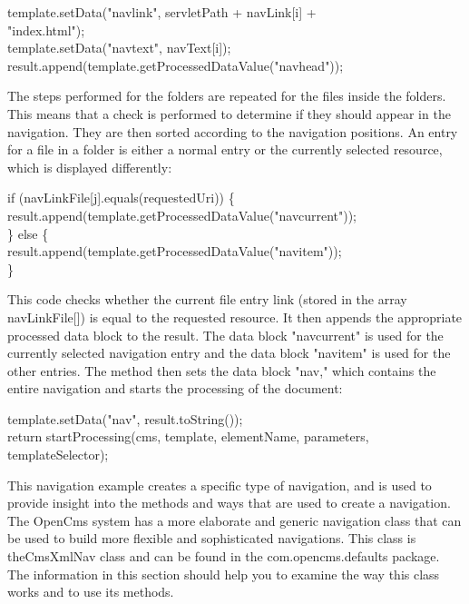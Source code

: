 \begin{java}
template.setData("navlink", servletPath + navLink[i] +\\
\jtabc    "index.html");\\
template.setData("navtext", navText[i]);\\
result.append(template.getProcessedDataValue("navhead"));\\
\end{java}

The steps performed for the folders are repeated for the files inside
the folders. This means that a check is performed to determine if they
should appear in the navigation. They are then sorted according to the
navigation positions. An entry for a file in a folder is either a
normal entry or the currently selected resource, which is displayed
differently:

\begin{java}
if (navLinkFile[j].equals(requestedUri)) \{\\
\jtabb  result.append(template.getProcessedDataValue("navcurrent"));\\
\} else \{\\
\jtabb  result.append(template.getProcessedDataValue("navitem"));\\
\}\\
\end{java}

This code checks whether the current file entry link (stored in the
array {\name navLinkFile[])} is equal to the requested resource. It then
appends the appropriate processed data block to the result. The data
block {\name "navcurrent"} is used for the currently selected navigation entry
and the data block {\name "navitem"} is used for the other entries.
The method then sets the data block {\name "nav,"} which contains the entire
navigation and starts the processing of the document:

\begin{java}
template.setData("nav", result.toString());\\
return startProcessing(cms, template, elementName, parameters,\\
templateSelector);\\
\end{java}

This navigation example creates a specific type of navigation, and is
used to provide insight into the methods and ways that are used to
create a navigation. The OpenCms system has a more elaborate and
generic navigation class that can be used to build more flexible and
sophisticated navigations. This class is the{\class  CmsXmlNav} class and can be
found in the {\name com.opencms.defaults} package. The information in this
section should help you to examine the way this class works and to use
its methods.

